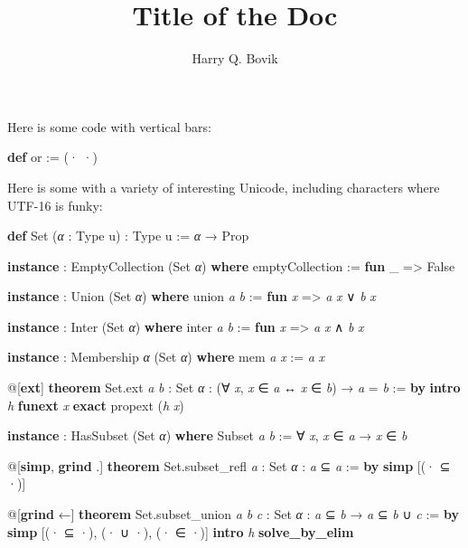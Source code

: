 \documentclass{memoir}
\title{\sffamily Title of the Doc}
\author{\sffamily Harry Q. Bovik}
\date{\sffamily }
\begin{document}
\frontmatter

\begin{titlingpage}
\maketitle
\end{titlingpage}

\tableofcontents


\cleardoublepage
Here is some code with vertical bars:
\begin{LeanVerbatim}
\textbf{def} or := (·  ·)

\end{LeanVerbatim}

Here is some with a variety of interesting Unicode, including characters where UTF-16 is funky:
\begin{LeanVerbatim}
\textbf{def} Set (\textit{α} : Type u) : Type u := \textit{α} → Prop

\textbf{instance} : EmptyCollection (Set \textit{α}) \textbf{where}
  emptyCollection := \textbf{fun} _ => False

\textbf{instance} : Union (Set \textit{α}) \textbf{where}
  union \textit{a} \textit{b} := \textbf{fun} \textit{x} => \textit{a} \textit{x} ∨ \textit{b} \textit{x}

\textbf{instance} : Inter (Set \textit{α}) \textbf{where}
  inter \textit{a} \textit{b} := \textbf{fun} \textit{x} => \textit{a} \textit{x} ∧ \textit{b} \textit{x}

\textbf{instance} : Membership \textit{α} (Set \textit{α}) \textbf{where}
  mem \textit{a} \textit{x} := \textit{a} \textit{x}

@[\textbf{ext}]
\textbf{theorem} Set.ext \textit{a} \textit{b} : Set \textit{α} :
    (∀ \textit{x}, \textit{x} ∈ \textit{a} ↔ \textit{x} ∈ \textit{b}) → \textit{a} = \textit{b} := \textbf{by}
  \textbf{intro} \textit{h}
  \textbf{funext} \textit{x}
  \textbf{exact} propext (\textit{h} \textit{x})

\textbf{instance} : HasSubset (Set \textit{α}) \textbf{where}
  Subset \textit{a} \textit{b} := ∀ \textit{x}, \textit{x} ∈ \textit{a} → \textit{x} ∈ \textit{b}

@[\textbf{simp}, \textbf{grind} .]
\textbf{theorem} Set.subset_refl \textit{a} : Set \textit{α} : \textit{a} ⊆ \textit{a} := \textbf{by}
  \textbf{simp} [(· ⊆ ·)]

@[\textbf{grind} ←]
\textbf{theorem} Set.subset_union \textit{a} \textit{b} \textit{c} : Set \textit{α} :
    \textit{a} ⊆ \textit{b} → \textit{a} ⊆ \textit{b} ∪ \textit{c} := \textbf{by}
  \textbf{simp} [(· ⊆ ·), (· ∪ ·), (· ∈ ·)]
  \textbf{intro} \textit{h}
  \textbf{solve_by_elim}


\end{LeanVerbatim}
\end{document}
